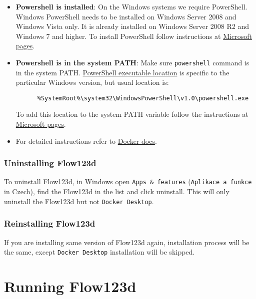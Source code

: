 \begin{itemize}
  \item \textbf{Powershell is installed}: On the Windows systems we require PowerShell. Windows PowerShell needs to be installed on Windows Server 2008 and Windows Vista only.
  It is already installed on Windows Server 2008 R2 and Windows 7 and higher. To install PowerShell follow instructions at
  \href{https://msdn.microsoft.com/en-us/powershell/scripting/setup/installing-windows-powershell}{Microsoft pages}.

  \item \textbf{Powershell is in the system PATH}: Make sure \verb'powershell' command is in the system PATH.
  \href{http://www.powershelladmin.com/wiki/PowerShell_Executables_File_System_Locations}{PowerShell executable location}
   is specific to the particular Windows version, but usual location is:
   \begin{verbatim}
      %SystemRoot%\system32\WindowsPowerShell\v1.0\powershell.exe
   \end{verbatim}
   To add this location to the system PATH variable follow the instructions at
   \href{https://msdn.microsoft.com/en-us/library/office/ee537574(v=office.14).aspx}{Microsoft pages}.

   \item For detailed instructions refer to \href{https://docs.docker.com/desktop/windows/}{Docker docs}.
\end{itemize}


\subsubsection{Uninstalling Flow123d}
To uninstall Flow123d, in Windows open \verb'Apps & features' (\verb'Aplikace a funkce' in Czech), find the Flow123d in the list
and click uninstall. This will only uninstall the Flow123d but not \verb'Docker Desktop'.


\subsubsection{Reinstalling Flow123d}
\label{duplicit-image}
If you are installing same version of Flow123d again, installation process will be the same,
except \verb'Docker Desktop' installation will be skipped.


\section{Running Flow123d}
